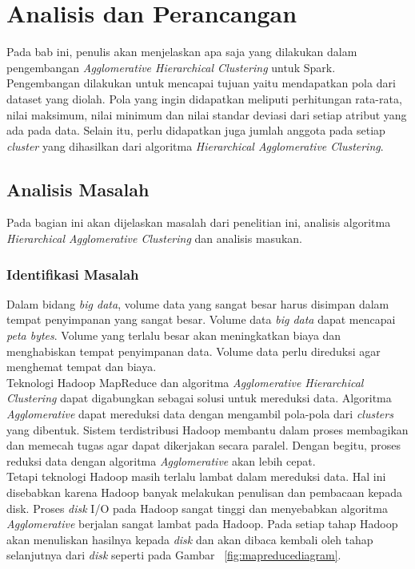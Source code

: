 \chapter{Analisis dan Perancangan}
\label{chap:Analisis dan Perancangan}

Pada bab ini, penulis akan menjelaskan apa saja yang dilakukan dalam pengembangan \textit{Agglomerative Hierarchical Clustering} untuk Spark. Pengembangan dilakukan untuk mencapai tujuan yaitu mendapatkan pola dari dataset yang diolah. Pola yang ingin didapatkan meliputi perhitungan rata-rata, nilai maksimum, nilai minimum dan nilai standar deviasi dari setiap atribut yang ada pada data. Selain itu, perlu didapatkan juga jumlah anggota pada setiap \textit{cluster} yang dihasilkan dari algoritma \textit{Hierarchical Agglomerative Clustering}.


\section{Analisis Masalah}

Pada bagian ini akan dijelaskan masalah dari penelitian ini, analisis algoritma \textit{Hierarchical Agglomerative Clustering} dan analisis masukan. 

\subsection{Identifikasi Masalah}

Dalam bidang \textit{big data}, volume data yang sangat besar harus disimpan dalam tempat penyimpanan yang sangat besar. Volume data \textit{big data} dapat mencapai \textit{peta bytes}. Volume yang terlalu besar akan meningkatkan biaya dan menghabiskan tempat penyimpanan data. Volume data perlu direduksi agar menghemat tempat dan biaya.\\ 

Teknologi Hadoop MapReduce dan algoritma \textit{Agglomerative Hierarchical Clustering} dapat digabungkan sebagai solusi untuk mereduksi data. Algoritma \textit{Agglomerative} dapat mereduksi data dengan mengambil pola-pola dari \textit{clusters} yang dibentuk. Sistem terdistribusi Hadoop membantu dalam proses membagikan dan memecah tugas agar dapat dikerjakan secara paralel.  Dengan begitu, proses reduksi data dengan algoritma \textit{Agglomerative} akan lebih cepat. \\

Tetapi teknologi Hadoop masih terlalu lambat dalam mereduksi data. Hal ini disebabkan karena Hadoop banyak melakukan penulisan dan pembacaan kepada disk. Proses \textit{disk} I/O pada Hadoop sangat tinggi dan menyebabkan algoritma \textit{Agglomerative} berjalan sangat lambat pada Hadoop. Pada setiap tahap Hadoop akan menuliskan hasilnya kepada \textit{disk} dan akan dibaca kembali oleh tahap selanjutnya dari \textit{disk} seperti pada Gambar  ~\ref{fig:mapreducediagram}.\\

